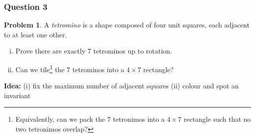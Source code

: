 \documentclass[11pt]{article}
\theoremstyle{definition}
\newtheorem*{problem}{Problem}
\begin{document}
\newpage 

\subsubsection{Question 3}

\begin{problem}
    A {\it tetromino} is a shape composed of four unit squares, each adjacent to at least one other. 
    \begin{enumerate}[(i)]
        \item Prove there are exactly $7$ tetrominos up to rotation. 
        \item Can we tile\footnote{
          Equivalently, can we pack the $7$ tetronimos into a $4 \times 7$ rectangle such that no two tetronimos 
          overlap?
        } the $7$ tetrominos into a $4 \times 7$ rectangle?
    \end{enumerate}
\end{problem}

{\bf Idea:} (i) fix the maximum number of adjacent squares (ii) colour and spot an invariant
\end{document}
